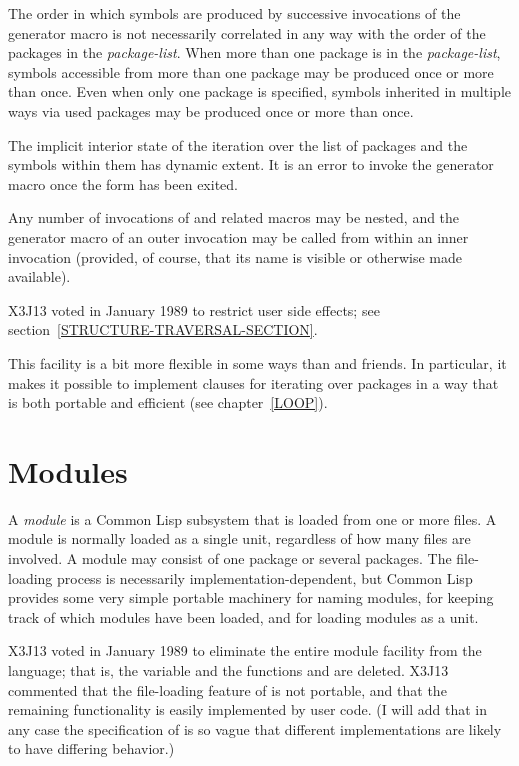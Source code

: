 \begin{new}
\begin{defmac}
The order in which symbols are produced by successive invocations
of the generator macro is not necessarily correlated in any way
with the order of the packages in the \emph{package-list}.
When more than one package is in the \emph{package-list},
symbols accessible from more than one package may be produced
once or more than once.  Even when only one package is specified,
symbols inherited in multiple ways via used packages may be
produced once or more than once.

The implicit interior state of the iteration over the list of packages
and the symbols within them has dynamic extent.
It is an error to invoke the generator macro
once the  form has been exited.

Any number of invocations of 
and related macros may be nested, and the generator macro of an
outer invocation may be called from within an inner invocation
(provided, of course, that its name is visible or otherwise made available).

X3J13 voted in January 1989
to restrict user side effects; see section~\ref{STRUCTURE-TRAVERSAL-SECTION}.

\beforenoterule
\begin{rationale}
This facility is a bit more flexible in some ways than 
and friends.
In particular, it makes it possible to implement 
clauses for iterating over packages in a way that is both portable
and efficient (see chapter~\ref{LOOP}).
\end{rationale}
\afternoterule
\end{defmac}
\end{new}

\section{Modules}

A \emph{module} is a Common Lisp subsystem that is loaded from one or more
files.  A module is normally loaded as a single unit, regardless of how
many files are involved.  A module may consist of one package or several
packages.  The file-loading process is necessarily
implementation-dependent, but Common Lisp provides some very simple
portable machinery for naming modules, for keeping track of which modules
have been loaded, and for loading modules as a unit.

\begin{new}
X3J13 voted in January 1989
to eliminate the entire module facility from
the language; that is, the variable  and the functions
 and  are deleted.
X3J13 commented that the file-loading feature of  is not
portable, and that the remaining functionality is easily implemented
by user code.  (I will add that in any case the specification of
 is so vague that different implementations are likely to
have differing behavior.)
\end{new}

